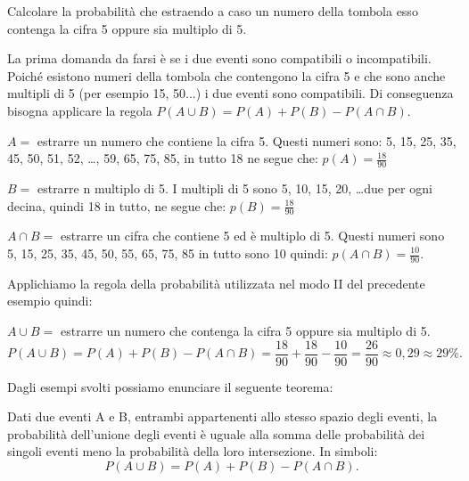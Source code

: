 \begin{esempio}
Calcolare la probabilità che estraendo a caso un numero della tombola esso 
contenga la cifra 5 oppure sia multiplo di 5.

La prima domanda da farsi è se i due eventi sono compatibili o 
incompatibili. 
Poiché esistono numeri della tombola che contengono la cifra 5 e che sono 
anche 
multipli di 5 (per esempio 15, 50...) i due eventi sono compatibili. Di 
conseguenza bisogna applicare la regola \(P(A\cup B)=P(A)+P(B)-P(A\cap B)\).
\begin{itemize*}
\item \( A = \) estrarre un numero che contiene la cifra 5. Questi numeri 
sono: 
5, 
15, 25, 35, 45, 50, 51, 52, \dots, 59, 65, 75, 85, in tutto 18 ne segue 
che: 
\(p(A)=\frac{18}{90}\)
\item \( B = \) estrarre n multiplo di 5. I multipli di 5 sono 5, 10, 15, 20, 
\dots due per ogni decina, quindi 18 in tutto, ne segue che: 
\(p(B)=\frac{18}{90}\)
\item \(A\cap B =\) estrarre un cifra che contiene 5 ed è multiplo di 5. 
Questi 
numeri sono 5, 15, 25, 35, 45, 50, 55, 65, 75, 85 in tutto sono 10 quindi: 
\(p(A\cap B)=\frac{10}{90}\).
\end{itemize*}
Applichiamo la regola della probabilità utilizzata nel modo II del 
precedente 
esempio quindi:

\(A\cup B =\) estrarre un numero che contenga la cifra 5 oppure sia multiplo 
di 5. 
\[ P(A\cup B)=P(A)+P(B)-P(A\cap 
B)=\frac{18}{90}+\frac{18}{90}-\frac{10}{90}=\frac{26}{90}\approx 
0,29\approx 
29\%. \]
\end{esempio}

Dagli esempi svolti possiamo enunciare il seguente teorema:

\begin{teorema}
Dati due eventi A e B, entrambi appartenenti allo stesso spazio degli 
eventi, 
la 
probabilità dell'unione degli eventi è uguale alla somma delle probabilità 
dei 
singoli eventi meno la probabilità della loro intersezione.
In simboli: \[ P(A\cup B)=P(A)+P(B)-P(A\cap B). \]
\end{teorema}

